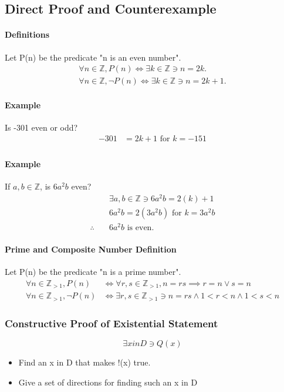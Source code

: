 \subsection{Direct Proof and Counterexample}
\hrulefill

\paragraph*{Definitions}
Let P(n) be the predicate "n is an even number".
\begin{align*}
    \forall n \in \mathbb{Z}, P(n) \iff \exists k \in \mathbb{Z} \ni n = 2k.\\
    \forall n \in \mathbb{Z}, \neg P(n) \iff \exists k \in \mathbb{Z} \ni n = 2k + 1.
\end{align*}

\paragraph*{Example}
Is -301 even or odd?
\begin{align*}
    -301 &= 2k + 1 \text{ for } k=-151\\
\end{align*}

\paragraph*{Example}
If $a, b \in \mathbb{Z}$, is $6a^2b$ even?
\begin{align*}
    &\exists a, b \in \mathbb{Z} \ni 6a^2b = 2(k) + 1 \\
    &6a^2b = 2(3a^2b) \text{ for } k=3a^2b\\
    \therefore \quad &6a^2b \text{ is even.}
\end{align*}

\paragraph*{Prime and Composite Number Definition}
Let P(n) be the predicate "n is a prime number".
\begin{align*}
    \forall n \in \mathbb{Z}_{>1}, P(n) &\iff \forall r, s \in \mathbb{Z}_{>1}, n=rs \implies r=n \lor s=n\\
    \forall n \in \mathbb{Z}_{>1}, \neg P(n) &\iff \exists r, s \in \mathbb{Z}_{>1} \ni n=rs \land 1 < r < n \land 1 < s < n
\end{align*}

\subsubsection*{Constructive Proof of Existential Statement}
\begin{equation*}
    \exists x in D \ni Q(x)
\end{equation*}
\begin{itemize}
    \item Find an x in D that makes !(x) true.
    \item Give a set of directions for finding such an x in D
\end{itemize}

